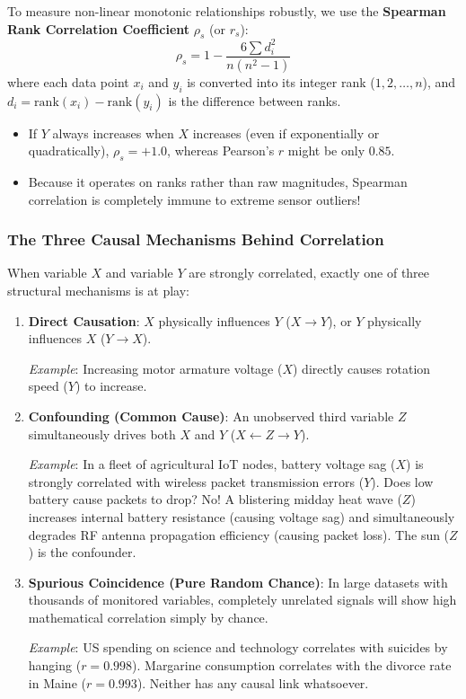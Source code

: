 To measure non-linear monotonic relationships robustly, we use the \textbf{Spearman Rank Correlation Coefficient} $\rho_s$ (or $r_s$):
\begin{equation}
\rho_s = 1 - \frac{6 \sum d_i^2}{n(n^2 - 1)}\label{eq:spearman_rho}
\end{equation}
where each data point $x_i$ and $y_i$ is converted into its integer rank ($1, 2, \dots, n$), and $d_i = \text{rank}(x_i) - \text{rank}(y_i)$ is the difference between ranks.
\begin{itemize}
    \item If $Y$ always increases when $X$ increases (even if exponentially or quadratically), $\rho_s = +1.0$, whereas Pearson's $r$ might be only $0.85$.
    \item Because it operates on ranks rather than raw magnitudes, Spearman correlation is completely immune to extreme sensor outliers!
\end{itemize}

\subsubsection{The Three Causal Mechanisms Behind Correlation}
When variable $X$ and variable $Y$ are strongly correlated, exactly one of three structural mechanisms is at play:
\begin{enumerate}
    \item \textbf{Direct Causation}: $X$ physically influences $Y$ ($X \to Y$), or $Y$ physically influences $X$ ($Y \to X$). 
    
    \textit{Example}: Increasing motor armature voltage ($X$) directly causes rotation speed ($Y$) to increase.
    \item \textbf{Confounding (Common Cause)}: An unobserved third variable $Z$ simultaneously drives both $X$ and $Y$ ($X \leftarrow Z \to Y$).
    
    \textit{Example}: In a fleet of agricultural IoT nodes, battery voltage sag ($X$) is strongly correlated with wireless packet transmission errors ($Y$). Does low battery cause packets to drop? No! A blistering midday heat wave ($Z$) increases internal battery resistance (causing voltage sag) and simultaneously degrades RF antenna propagation efficiency (causing packet loss). The sun ($Z$) is the confounder.
    \item \textbf{Spurious Coincidence (Pure Random Chance)}: In large datasets with thousands of monitored variables, completely unrelated signals will show high mathematical correlation simply by chance.
    
    \textit{Example}: US spending on science and technology correlates with suicides by hanging ($r = 0.998$). Margarine consumption correlates with the divorce rate in Maine ($r = 0.993$). Neither has any causal link whatsoever.
\end{enumerate}

